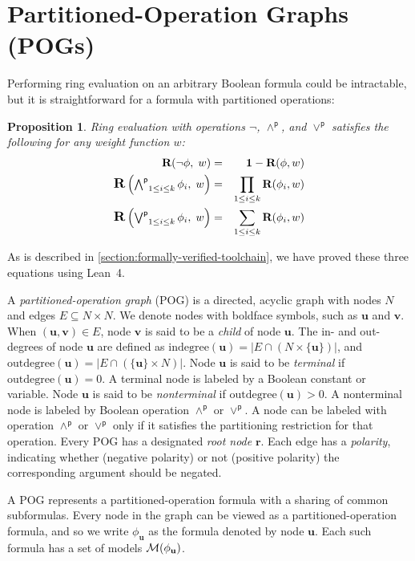 \documentclass[twoside,11pt]{article}
\newcommand{\pand}{\mathbin{\land^\textsf{p}}}
\newcommand{\por}{\mathbin{\lor^\textsf{p}}}
\DeclareMathOperator*{\Pand}{\bigwedge^\textsf{p}}
\DeclareMathOperator*{\Por}{\bigvee^\textsf{p}}
\newcommand{\boolnot}{\neg}
\newcommand{\rep}{\textbf{R}}
\newcommand{\mulident}{\textbf{1}}
\newcommand{\modelset}{{\cal M}}
\newcommand{\indegree}{\textrm{indegree}}
\newcommand{\outdegree}{\textrm{outdegree}}
\newcommand{\makenode}[1]{\mathbf{#1}}
\newcommand{\nodeu}{\makenode{u}}
\newcommand{\nodev}{\makenode{v}}
\newcommand{\noder}{\makenode{r}}
\newtheorem{prop}{Proposition}
\newcommand{\lean}{Lean~4}
\begin{document}
\section{Partitioned-Operation Graphs (POGs)}
\label{sect:pog}

Performing ring evaluation on an arbitrary Boolean formula could be intractable, but it is straightforward for a formula with partitioned operations:
\begin{prop}
\label{prop:ring:eval}
Ring evaluation with operations $\boolnot$, $\pand$, and $\por$ satisfies the following for any weight function $w$:
\begin{eqnarray}
\rep(\boolnot \phi,\; w) &=& \mulident - \rep(\phi, w) \label{eqn:ring:negation}\\
\textstyle
\scalebox{1.2}{\rep}\left(\Pand_{1 \leq i \leq k} \phi_i,\; w \right) &=& \prod_{1 \leq i \leq k} \rep(\phi_i, w) \label{eqn:ring:product}\\
\textstyle
\scalebox{1.2}{\rep}\left(\Por_{1 \leq i \leq k} \phi_i,\; w\right) &=& \sum_{1 \leq i \leq k} \rep(\phi_i, w) \label{eqn:ring:sum} 
\end{eqnarray}
\end{prop}
As is described in \ref{section:formally-verified-toolchain}, we have proved these three equations using \lean{}.

A \emph{partitioned-operation graph} (POG) is a directed, acyclic
graph with nodes $N$ and edges $E \subseteq N \times N$.  We denote
nodes with boldface symbols, such as $\nodeu$ and $\nodev$.  When
$(\nodeu,\nodev) \in E$, node $\nodev$ is said to be a \emph{child} of
node $\nodeu$.  The in- and out-degrees of node $\nodeu$ are defined
as $\indegree(\nodeu) = | E \cap (N \times \{\nodeu\}) |$, and
$\outdegree(\nodeu) = | E \cap (\{\nodeu\} \times N) |$.  Node
$\nodeu$ is said to be \emph{terminal} if $\outdegree(\nodeu) = 0$.  A
terminal node is labeled by a Boolean constant or variable.  Node
$\nodeu$ is said to be \emph{nonterminal} if $\outdegree(\nodeu) > 0$.
A nonterminal node is labeled by Boolean operation $\pand$ or $\por$.
A node can be labeled with operation $\pand$ or $\por$ only if it
satisfies the partitioning restriction for that operation.  Every POG
has a designated \emph{root node} $\noder$.  Each edge has
a \emph{polarity}, indicating whether (negative polarity) or not
(positive polarity) the corresponding argument should be negated.

A POG represents a partitioned-operation
formula with a sharing of common subformulas.  Every node in the graph can be viewed as a partitioned-operation formula, and so we write
$\phi_{\nodeu}$ as the formula denoted by node $\nodeu$.
Each such formula has a set of models $\modelset(\phi_{\nodeu})$.
\end{document}
